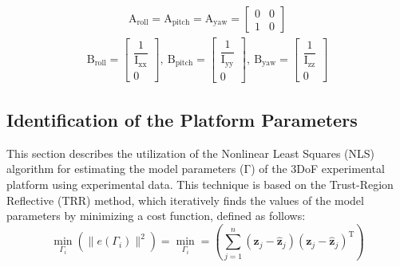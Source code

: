 \documentclass[preprint,12pt,authoryear]{elsarticle}
\begin{document}
\begin{equation}
	\begin{split}
		\boldsymbol{\mathrm{A}}_{\text{roll}}  =\boldsymbol{\mathrm{A}}_{\text{pitch}}  = \boldsymbol{\mathrm{A}}_{\text{yaw}}  = \begin{bmatrix}
			0 & 0\\
			1 & 0
		\end{bmatrix}
	\end{split}
\end{equation}
\begin{equation}
	\begin{split}
		\boldsymbol{\mathrm{B}}_{\text{roll}}  = \begin{bmatrix}
			\dfrac{1}{\mathrm{I}_{\text{xx}}}
			\\[1em]
			0
		\end{bmatrix},~ \boldsymbol{\mathrm{B}}_{\text{pitch}}  = \begin{bmatrix}
			\dfrac{1}{\mathrm{I}_{\text{yy}}}
			\\[1em]
			0
		\end{bmatrix},~ \boldsymbol{\mathrm{B}}_{\text{yaw}}  = \begin{bmatrix}
			\dfrac{1}{\mathrm{I}_{\text{zz}}}
			\\[1em]
			0
		\end{bmatrix}
	\end{split}
\end{equation}
\subsection{Identification of the Platform Parameters}
\noindent This section describes the utilization of the Nonlinear Least Squares (NLS) algorithm for estimating the model parameters ($\boldsymbol{\mathrm{\Gamma}}$) of the 3DoF experimental platform using experimental data.
This technique is based on the Trust-Region Reflective (TRR) method, which iteratively finds the values of the model parameters by minimizing a cost function, defined as follows:
\begin{equation}
	\min_{\Gamma_i}\left(\parallel e(\Gamma_i) \parallel^2\right) = 
	\min_{\Gamma_i} = \left(\sum_{j=1}^{n}(\boldsymbol{z}_j- \hat{\boldsymbol{z}}_j)(\boldsymbol{z}_j- \hat{\boldsymbol{z}}_j)^\mathrm{T}\right)
\end{equation} %
\end{document}

